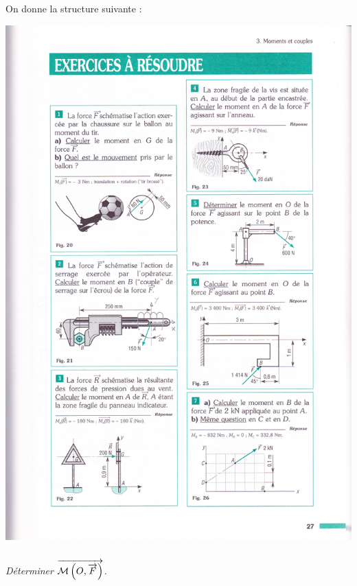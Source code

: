 \documentclass[10pt,fleqn]{book} %
\begin{document}
\begin{multicols}{2}
On donne la structure suivante : 
\begin{center}
\includegraphics[width=.8\linewidth]{images/fig_05}
\end{center}


\subparagraph{}
\textit{Déterminer $\overrightarrow{\mathcal{M}\left(O,\overrightarrow{F} \right)}$.}
\end{multicols}

\end{document}
